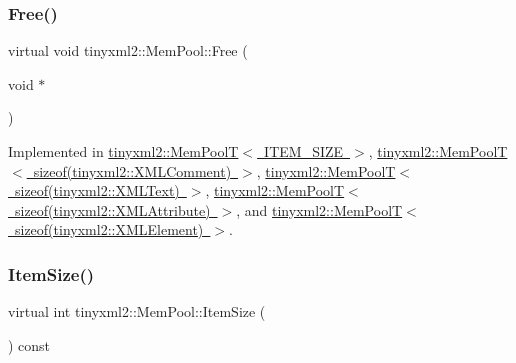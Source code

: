 \mbox{\label{classtinyxml2_1_1_mem_pool_a49e3bfac2cba2ebd6776b31e571f64f7}} 
\subsubsection{\texorpdfstring{Free()}{Free()}}
{\footnotesize\ttfamily virtual void tinyxml2\+::\+Mem\+Pool\+::\+Free (\begin{DoxyParamCaption}\item[{void $\ast$}]{ }\end{DoxyParamCaption})\hspace{0.3cm}{\ttfamily [pure virtual]}}



Implemented in \mbox{\hyperlink{classtinyxml2_1_1_mem_pool_t_a408ce0918e9d3d5e5e1cc4896944875f}{tinyxml2\+::\+Mem\+Pool\+T$<$ I\+T\+E\+M\+\_\+\+S\+I\+Z\+E $>$}}, \mbox{\hyperlink{classtinyxml2_1_1_mem_pool_t_a408ce0918e9d3d5e5e1cc4896944875f}{tinyxml2\+::\+Mem\+Pool\+T$<$ sizeof(tinyxml2\+::\+X\+M\+L\+Comment) $>$}}, \mbox{\hyperlink{classtinyxml2_1_1_mem_pool_t_a408ce0918e9d3d5e5e1cc4896944875f}{tinyxml2\+::\+Mem\+Pool\+T$<$ sizeof(tinyxml2\+::\+X\+M\+L\+Text) $>$}}, \mbox{\hyperlink{classtinyxml2_1_1_mem_pool_t_a408ce0918e9d3d5e5e1cc4896944875f}{tinyxml2\+::\+Mem\+Pool\+T$<$ sizeof(tinyxml2\+::\+X\+M\+L\+Attribute) $>$}}, and \mbox{\hyperlink{classtinyxml2_1_1_mem_pool_t_a408ce0918e9d3d5e5e1cc4896944875f}{tinyxml2\+::\+Mem\+Pool\+T$<$ sizeof(tinyxml2\+::\+X\+M\+L\+Element) $>$}}.

\mbox{\label{classtinyxml2_1_1_mem_pool_a0c518d49e3a94bde566f61e13b7240bb}} 
\subsubsection{\texorpdfstring{Item\+Size()}{ItemSize()}}
{\footnotesize\ttfamily virtual int tinyxml2\+::\+Mem\+Pool\+::\+Item\+Size (\begin{DoxyParamCaption}{ }\end{DoxyParamCaption}) const\hspace{0.3cm}{\ttfamily [pure virtual]}}



